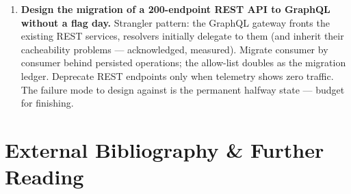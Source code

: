 \begin{enumerate}[label=\textbf{Q\arabic*.}, leftmargin=2.6em]
        (``1--50 of 38{,}412''). Ship \texttt{hasNextPage} by default,
        \texttt{totalCount} behind an explicit argument with a cost
        weight that prices it honestly, and approximate counts where the
        UI truly needs magnitude.
  \item \textbf{Design the migration of a 200-endpoint REST API to
        GraphQL without a flag day.}
        Strangler pattern: the GraphQL gateway fronts the existing REST
        services, resolvers initially delegate to them (and inherit their
        cacheability problems --- acknowledged, measured). Migrate
        consumer by consumer behind persisted operations; the allow-list
        doubles as the migration ledger. Deprecate REST endpoints only
        when telemetry shows zero traffic. The failure mode to design
        against is the permanent halfway state --- budget for finishing.
\end{enumerate}

\section{External Bibliography \& Further Reading}
\label{sec:ch12-bibliography}

